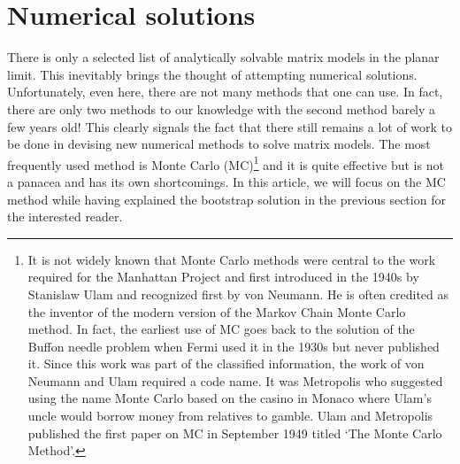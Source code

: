 \documentclass[letter,11pt]{article}
\begin{document}
\section{\label{sec:NSOL}Numerical solutions} 
There is only a selected list of analytically solvable matrix models in the planar limit. This inevitably brings 
the thought of attempting numerical solutions. Unfortunately, even here, there are not many methods that one can use. 
In fact, there are only two methods to our knowledge with the second method barely a few years old! This clearly signals 
the fact that there still remains a lot of work to be done in devising new numerical 
methods to solve matrix models. The most frequently used method is Monte Carlo (MC)\footnote{
It is not widely known that Monte Carlo methods were central to the work required for the Manhattan Project
and first introduced in the 1940s by Stanislaw Ulam and recognized first by von Neumann. 
He is often credited as the inventor of the modern version of the Markov Chain Monte Carlo 
method. In fact, the earliest use of MC goes back to the solution of the Buffon needle problem when Fermi used it in the 
1930s but never published it. 
Since this work was part of the classified information, the work of von Neumann and Ulam required a code name. It was Metropolis who 
suggested using the name Monte Carlo based on the casino in 
Monaco where Ulam's uncle would borrow money from relatives to gamble. Ulam and Metropolis
published the first paper on MC in September 1949 titled `The Monte Carlo Method'.} 
and it is quite effective but is not a panacea and has its own shortcomings. In this article, we will focus on the MC method while 
having explained the bootstrap solution in the previous section for the interested reader. 
 
\end{document}
